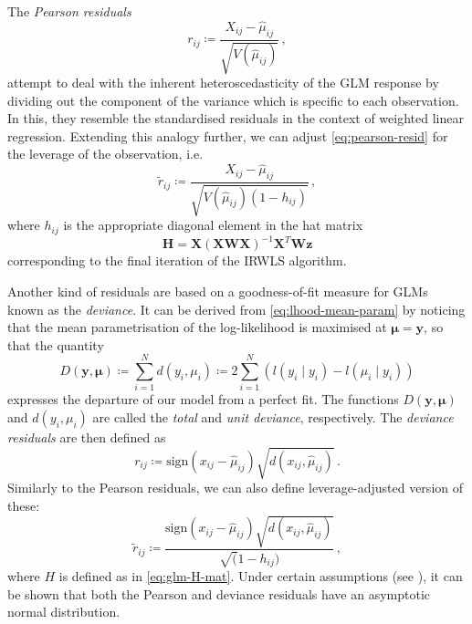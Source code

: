 \documentclass[a4paper]{book}
\begin{document}
The \emph{Pearson residuals}
\begin{equation} \label{eq:pearson-resid}
  r_{ij} \coloneqq \frac{X_{ij} - \widehat{\mu}_{ij}}{\sqrt{V(\widehat{\mu}_{ij})}} \,,
\end{equation}
attempt to deal with the inherent heteroscedasticity of the GLM response by dividing out the component of the variance which is specific to each observation. In this, they resemble the standardised residuals in the context of weighted linear regression. Extending this analogy further, we can adjust \cref{eq:pearson-resid} for the leverage of the observation, i.e.
\begin{equation}
  \tilde{r}_{ij} \coloneqq \frac{X_{ij} - \widehat{\mu}_{ij}}{\sqrt{V(\widehat{\mu}_{ij}) (1 - h_{ij})}} \,,
\end{equation}
where $h_{ij}$ is the appropriate diagonal element in the hat matrix
\begin{equation} \label{eq:glm-H-mat}
  \mathbf{H} = \mathbf{X} (\mathbf{XWX})^{-1} \mathbf{X}^T \mathbf{W} \mathbf{z}
\end{equation}
corresponding to the final iteration of the IRWLS algorithm.

Another kind of residuals are based on a goodness-of-fit measure for GLMs known as the \emph{deviance}. It can be derived from \cref{eq:lhood-mean-param} by noticing that the mean parametrisation of the log-likelihood is maximised at $\bm{\mu} = \mathbf{y}$, so that the quantity
\begin{equation}
  D(\mathbf{y}, \bm{\mu}) \coloneqq \sum_{i = 1}^N d(y_i, \mu_i) \coloneqq 2 \sum_{i = 1}^N (l(y_i \mid y_i) - l(\widehat{\mu}_i \mid y_i))
\end{equation}
expresses the departure of our model from a perfect fit. The functions $D(\mathbf{y}, \bm{\mu})$ and $d(y_i, \mu_i)$ are called the \emph{total} and \emph{unit deviance}, respectively. The \emph{deviance residuals} are then defined as
\begin{equation}
  r_{ij} \coloneqq \mathrm{sign}(x_{ij} - \widehat{\mu}_{ij}) \sqrt{d(x_{ij}, \widehat{\mu}_{ij})} \,.
\end{equation}
Similarly to the Pearson residuals, we can also define leverage-adjusted version of these:
\begin{equation}
  \tilde{r}_{ij} \coloneqq \frac{\mathrm{sign}(x_{ij} - \widehat{\mu}_{ij}) \sqrt{d(x_{ij}, \widehat{\mu}_{ij})}}{\sqrt(1 - h_{ij})} \,,
\end{equation}
where $H$ is defined as in \cref{eq:glm-H-mat}. Under certain assumptions (see \cite[Section 7.5]{dunn:rand-quant-res}), it can be shown that both the Pearson and deviance residuals have an asymptotic normal distribution.
\end{document}
